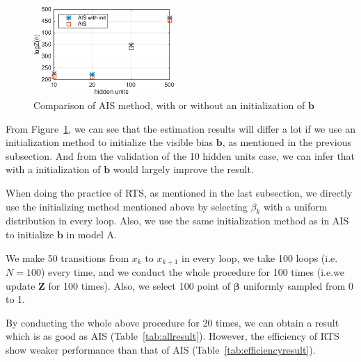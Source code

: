 \begin{figure}[t]
	\centering
	\includegraphics[width=0.48\textwidth]{figure/AIS_results/ais_result.eps}
	\caption{Comparison of AIS method, with or without an initialization of $\mathbf b$}
\label{fig:aisinit} %
\end{figure}
From Figure~\ref{fig:aisinit}, we can see that the estimation results will differ a lot if we use an initialization method to initialize the visible bias $\mathbf b$, as mentioned in the previous subsection. And from the validation of the 10 hidden units case, we can infer that with a initialization of $\mathbf b$ would largely improve the result.




When doing the practice of RTS, as mentioned in the last subsection, we directly use the initializing method mentioned above by selecting $\beta_{k}$ with a uniform distribution in every loop. Also, we use the same initialization method as in AIS to initialize $\mathbf b$ in model A. 

We make 50 transitions from $x_{k}$ to $x_{k+1}$ in every loop, we take 100 loops (i.e.$N=100$) every time, and we conduct the whole procedure for 100 times (i.e.we update $\mathbf Z$ for 100 times). Also, we select 100 point of $\mathbf \beta$ uniformly sampled from 0 to 1. 

By conducting the whole above procedure for 20 times, we can obtain a result which is as good as AIS (Table~\ref{tab:allresult}). However, the efficiency of RTS show weaker performance than that of AIS (Table~\ref{tab:efficiencyresult}).

